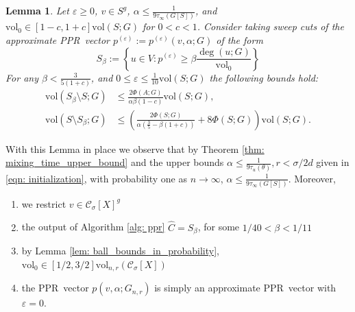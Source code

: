 \documentclass[11pt,twoside]{article}
\newtheorem{lemma}{Lemma}
\newcommand{\vol}{\mathrm{vol}}
\newcommand{\1}{\mathbf{1}}
\newcommand{\pbf}{p}        %
\newcommand{\Xbf}{X}             %
\newcommand{\Cset}{\mathcal{C}}
\newcommand{\Csig}{\Cset_{\sigma}}
\newcommand{\pprspace}{{\sc PPR~}}
\begin{document}
\begin{lemma}
	\label{lem: zhu}
	Let $\varepsilon \geq 0$, $v \in S^g$, $\alpha \leq \frac{1}{9\tau_{\infty}(G[S])}$, and $\vol_0 \in [1 - c,1 + c] \vol(S;G)$ for $0 < c < 1$. Consider taking sweep cuts of the approximate \pprspace vector $\pbf^{(\varepsilon)} := \pbf^{(\varepsilon)}(v,\alpha; G)$ of the form
	\begin{equation*}
	S_{\beta} := \left\{u \in V: \pbf^{(\varepsilon)} \geq \beta \frac{\deg(u; G)}{\vol_0} \right\}
	\end{equation*}
	For any $\beta < \frac{3}{5(1 + c)}$, and $0 \leq \varepsilon \leq \frac{1}{10} \vol(S;G)$ the following bounds hold:
	\begin{align}
	\vol(S_{\beta} \setminus S; G) & \leq \frac{2\Phi(A;G)}{\alpha \beta(1 - c)} \vol(S; G), \label{eqn: zhu_1}\\
	\vol(S \setminus S_{\beta}; G) & \leq \left(\frac{2\Phi(S;G)}{\alpha (\frac{3}{5} - \beta(1 + c))} + 8\Phi(S;G)\right)\vol(S; G).  \label{eqn: zhu_2}
	\end{align}
\end{lemma}
With this Lemma in place we
observe that by Theorem \ref{thm: mixing_time_upper_bound} and the upper bounds $\alpha \leq \frac{1}{9 \tau_u(\theta)}, r < \sigma/2d$ given in \eqref{eqn: initialization}, with probability one as $n \to \infty$, $\alpha \leq \frac{1}{9\tau_{\infty}(G[S])}$. Moreover, 
\begin{enumerate}
	\item we restrict $v \in \Csig[\Xbf]^g$
	\item the output of Algorithm \ref{alg: ppr} $\widehat{C} = S_{\beta}$, for some $1/40 < \beta < 1/11$
	\item by Lemma \ref{lem: ball_bounds_in_probability}, $\vol_0 \in [1/2,3/2]\vol_{n,r}(\Csig[\Xbf])$
	\item the \pprspace vector $\pbf(v,\alpha;G_{n,r})$ is simply an approximate \pprspace vector with $\varepsilon = 0$.
\end{enumerate}
\end{document}
